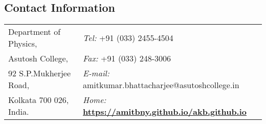 \documentclass[margin,line]{res}
\begin{document}
\begin{resume}



\section{\sc Contact Information}
\vspace{.05in}
\begin{tabular}{@{}p{2.5in}p{4in}}
Department of Physics,                    & {\it Tel:}  +91 (033) 2455-4504 \\            
Asutosh College,                          & {\it Fax:}  +91 (033) 248-3006 \\         
92 S.P.Mukherjee Road,                    & {\it E-mail:} amitkumar.bhattacharjee@asutoshcollege.in\\       
Kolkata 700 026, India.                   & {\it Home:} \href{https://amitbny.github.io/akb.github.io}{\textbf{https://amitbny.github.io/akb.github.io}}
\end{tabular}



\end{resume}
\end{document}
